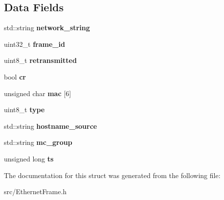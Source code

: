 \subsection*{Data Fields}
\begin{DoxyCompactItemize}
\item 
\hypertarget{structstc__frame_a3a8da73a7a618941115ab6853de30a01}{std\-::string {\bfseries network\-\_\-string}}\label{structstc__frame_a3a8da73a7a618941115ab6853de30a01}

\item 
\hypertarget{structstc__frame_a5b38e52bcffb8057430e290594b15232}{uint32\-\_\-t {\bfseries frame\-\_\-id}}\label{structstc__frame_a5b38e52bcffb8057430e290594b15232}

\item 
\hypertarget{structstc__frame_a8735d03fa5449af5e31f2111ee4381b5}{uint8\-\_\-t {\bfseries retransmitted}}\label{structstc__frame_a8735d03fa5449af5e31f2111ee4381b5}

\item 
\hypertarget{structstc__frame_a7f3b7f11f950ae16689e72f213d1cc73}{bool {\bfseries cr}}\label{structstc__frame_a7f3b7f11f950ae16689e72f213d1cc73}

\item 
\hypertarget{structstc__frame_a16e5e51a2b2abf7e3ea96e27dde70527}{unsigned char {\bfseries mac} \mbox{[}6\mbox{]}}\label{structstc__frame_a16e5e51a2b2abf7e3ea96e27dde70527}

\item 
\hypertarget{structstc__frame_a6fe26bc08e6b1a94d02b1ad9b07b9714}{uint8\-\_\-t {\bfseries type}}\label{structstc__frame_a6fe26bc08e6b1a94d02b1ad9b07b9714}

\item 
\hypertarget{structstc__frame_a297a8359a1279b4647324cd9db100d4b}{std\-::string {\bfseries hostname\-\_\-source}}\label{structstc__frame_a297a8359a1279b4647324cd9db100d4b}

\item 
\hypertarget{structstc__frame_a91ad7ccd8878306de0b47791000be524}{std\-::string {\bfseries mc\-\_\-group}}\label{structstc__frame_a91ad7ccd8878306de0b47791000be524}

\item 
\hypertarget{structstc__frame_a1ce6c3532b0d8d835a5c5b3f28cec2c7}{unsigned long {\bfseries ts}}\label{structstc__frame_a1ce6c3532b0d8d835a5c5b3f28cec2c7}

\end{DoxyCompactItemize}


The documentation for this struct was generated from the following file\-:\begin{DoxyCompactItemize}
\item 
src/Ethernet\-Frame.\-h\end{DoxyCompactItemize}
